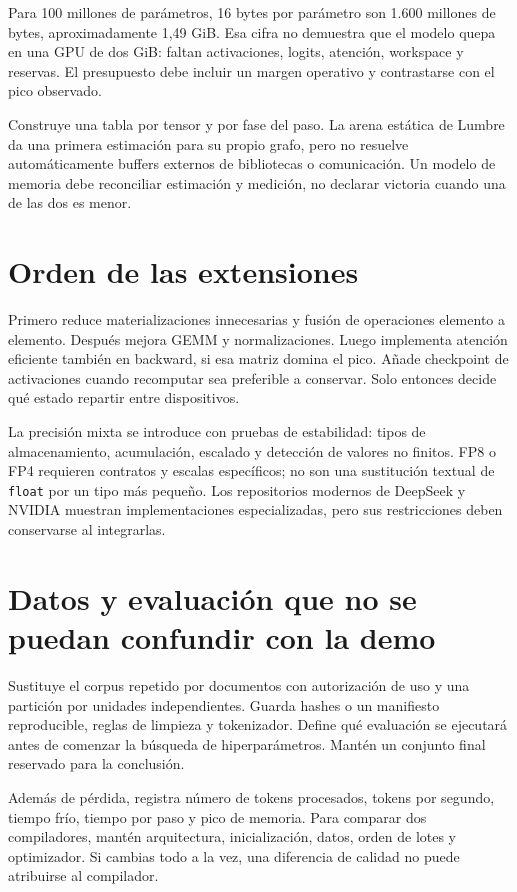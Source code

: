 \documentclass[12pt,a4paper,oneside]{report}
\begin{document}
Para 100 millones de parámetros, 16 bytes por parámetro son 1.600 millones de bytes, aproximadamente 1,49 GiB. Esa cifra no demuestra que el modelo quepa en una GPU de dos GiB: faltan activaciones, logits, atención, workspace y reservas. El presupuesto debe incluir un margen operativo y contrastarse con el pico observado.

Construye una tabla por tensor y por fase del paso. La arena estática de Lumbre da una primera estimación para su propio grafo, pero no resuelve automáticamente buffers externos de bibliotecas o comunicación. Un modelo de memoria debe reconciliar estimación y medición, no declarar victoria cuando una de las dos es menor.

\section{Orden de las extensiones}
Primero reduce materializaciones innecesarias y fusión de operaciones elemento a elemento. Después mejora GEMM y normalizaciones. Luego implementa atención eficiente también en backward, si esa matriz domina el pico. Añade checkpoint de activaciones cuando recomputar sea preferible a conservar. Solo entonces decide qué estado repartir entre dispositivos.

La precisión mixta se introduce con pruebas de estabilidad: tipos de almacenamiento, acumulación, escalado y detección de valores no finitos. FP8 o FP4 requieren contratos y escalas específicos; no son una sustitución textual de \texttt{float} por un tipo más pequeño. Los repositorios modernos de DeepSeek y NVIDIA muestran implementaciones especializadas, pero sus restricciones deben conservarse al integrarlas. \cite{deepgemm,cutlass,deepseek-v3,deepseek-v4}

\section{Datos y evaluación que no se puedan confundir con la demo}
Sustituye el corpus repetido por documentos con autorización de uso y una partición por unidades independientes. Guarda hashes o un manifiesto reproducible, reglas de limpieza y tokenizador. Define qué evaluación se ejecutará antes de comenzar la búsqueda de hiperparámetros. Mantén un conjunto final reservado para la conclusión.

Además de pérdida, registra número de tokens procesados, tokens por segundo, tiempo frío, tiempo por paso y pico de memoria. Para comparar dos compiladores, mantén arquitectura, inicialización, datos, orden de lotes y optimizador. Si cambias todo a la vez, una diferencia de calidad no puede atribuirse al compilador.
\end{document}
